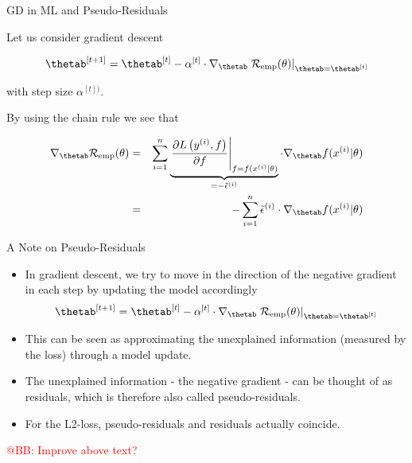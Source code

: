 \begin{vbframe}{GD in ML and Pseudo-Residuals}

Let us consider gradient descent

$$
	 \thetab^{[t + 1]} = \thetab^{[t]} - \alpha^{[t]} \cdot \nabla_{\thetab} \left.\risket\right|_{\thetab = \thetab^{[t]}}		
$$

with step size $\alpha^{[t])}$.  

\lz 

By using the chain rule we see that 

\vspace*{-0.5cm}

\begin{eqnarray*}
\nabla_{\thetab} \risket &=&\sumin \underbrace{\left.\frac{\partial L\left(\yi, f\right)}{\partial f} \right|_{f = \fxit} }_{= - \tilde \eps^{(i)}}
\cdot \nabla_{\thetab} \fxit \\ 
&=& - \sumin \tilde \eps^{(i)} \cdot \nabla_{\thetab} \fxit
\end{eqnarray*}

\end{vbframe}

\begin{vbframe}{A Note on Pseudo-Residuals}

\begin{itemize}
	\item In gradient descent, we try to move in the direction of the negative gradient in each step by updating the model accordingly 
	$$
	 \thetab^{[t + 1]} = \thetab^{[t]} - \alpha^{[t]} \cdot \nabla_{\thetab} \left.\risket\right|_{\thetab = \thetab^{[t]}}		
	$$
	\item This can be seen as approximating the unexplained information (measured by the loss) through a model update.
	\item The unexplained information - the negative gradient - can be thought of as residuals, which is therefore also called pseudo-residuals.
	\item For the L2-loss, pseudo-residuals and residuals actually coincide.
\end{itemize}

\textcolor{red}{@BB: Improve above text? }


\end{vbframe}


\endlecture

